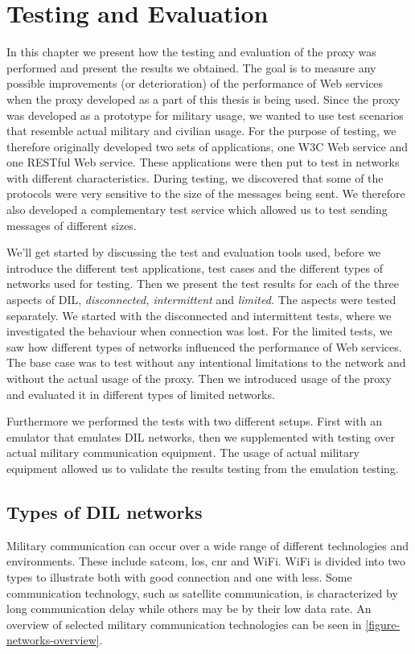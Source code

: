 \chapter{Testing and Evaluation}

In this chapter we present how the testing and evaluation of the proxy was
performed and present the results we obtained.  The goal is to measure any
possible improvements (or deterioration) of the performance of Web services when
the proxy developed as a part of this thesis is being used. Since the proxy was
developed as a prototype for military usage, we wanted to use test scenarios
that resemble actual military and civilian usage. For the purpose of testing,
we therefore originally developed two sets of applications, one W3C Web service
and one RESTful Web service. These applications were then put to test in
networks with different characteristics. During testing, we discovered that some
of the protocols were very sensitive to the size of the messages being sent. We
therefore also developed a complementary test service which allowed us to test
sending messages of different sizes.

We'll get started by discussing the test and evaluation tools used, before we
introduce the different test applications, test cases and the different types
of networks used for testing. Then we present the test results for each of the
three aspects of DIL, \textit{disconnected, intermittent} and
\textit{limited.} The aspects were tested separately. We started with the
disconnected and intermittent tests, where we investigated the behaviour when
connection was lost. For the limited tests, we saw how different types of
networks influenced the performance of Web services. The base case was to
test without any intentional limitations to the network and without the actual
usage of the proxy. Then we introduced usage of the proxy and evaluated it in
different types of limited networks.

Furthermore we performed the tests with two different setups. First with an
emulator that emulates DIL networks, then we supplemented with testing over
actual military communication equipment. The usage of actual military equipment
allowed us to validate the results testing from the emulation testing.

\section{Types of DIL networks}

Military communication can occur over a wide range of different technologies and
environments. These include \gls{satcom}, \gls{los},
\gls{cnr} and WiFi. WiFi is divided into two types to illustrate both
with good connection and one with less. Some communication technology, such as
satellite communication, is characterized by long communication delay while
others may be by their low data rate. An overview of selected military
communication technologies can be seen in \cref{figure-networks-overview}.


